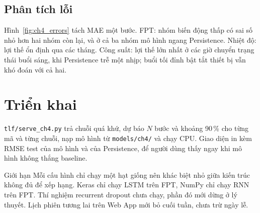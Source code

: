 \subsection{Phân tích lỗi}
Hình~\ref{fig:ch4_errors} tách MAE một bước. FPT: nhóm biến động thấp có sai số nhỏ hơn hai nhóm còn lại, và ở cả ba nhóm mô hình ngang Persistence. Nhiệt độ: lợi thế ổn định qua các tháng. Công suất: lợi thế lớn nhất ở các giờ chuyển trạng thái buổi sáng, khi Persistence trễ một nhịp; buổi tối đỉnh bật tắt thiết bị vẫn khó đoán với cả hai.


\section{Triển khai}
\texttt{tlf/serve\_ch4.py} trả chuỗi quá khứ, dự báo $N$ bước và khoảng 90\,\% cho từng mã và từng chuỗi, nạp mô hình từ \texttt{models/ch4/} và chạy CPU. Giao diện in kèm RMSE test của mô hình và của Persistence, để người dùng thấy ngay khi mô hình không thắng baseline.


\begin{luuy}{Giới hạn}
Mỗi cấu hình chỉ chạy một hạt giống nên khác biệt nhỏ giữa kiến trúc không đủ để xếp hạng. Keras chỉ chạy LSTM trên FPT, NumPy chỉ chạy RNN trên FPT. Thí nghiệm recurrent dropout chưa chạy, phần đó mới dừng ở lý thuyết. Lịch phiên tương lai trên Web App mới bỏ cuối tuần, chưa trừ ngày lễ.
\end{luuy}
